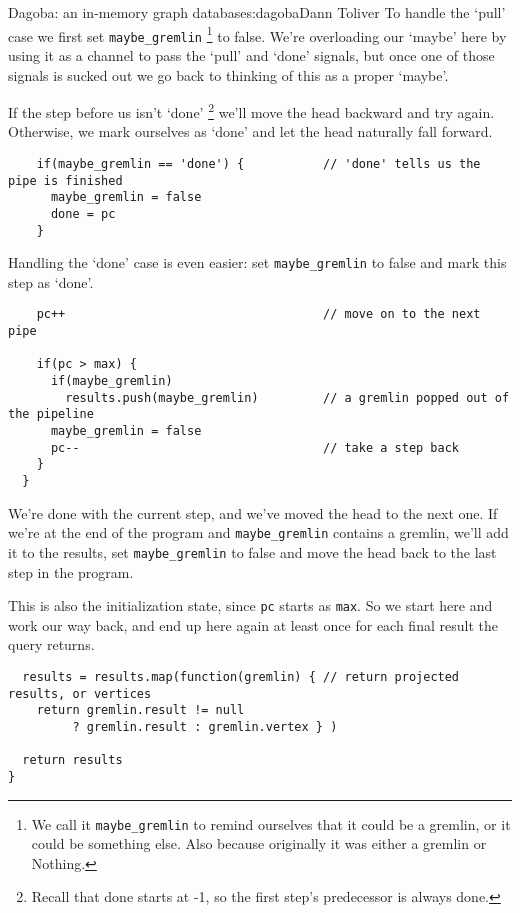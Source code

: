 \begin{aosachapter}{Dagoba: an in-memory graph database}{s:dagoba}{Dann Toliver}
To handle the `pull' case we first set \texttt{maybe\_gremlin}
\footnote{We call it \texttt{maybe\_gremlin} to remind ourselves that it
  could be a gremlin, or it could be something else. Also because
  originally it was either a gremlin or Nothing.} to false. We're
overloading our `maybe' here by using it as a channel to pass the `pull'
and `done' signals, but once one of those signals is sucked out we go
back to thinking of this as a proper `maybe'.

If the step before us isn't `done' \footnote{Recall that done starts at
  -1, so the first step's predecessor is always done.} we'll move the
head backward and try again. Otherwise, we mark ourselves as `done' and
let the head naturally fall forward.

\begin{verbatim}
    if(maybe_gremlin == 'done') {           // 'done' tells us the pipe is finished
      maybe_gremlin = false
      done = pc
    }
\end{verbatim}

Handling the `done' case is even easier: set \texttt{maybe\_gremlin} to
false and mark this step as `done'.

\begin{verbatim}
    pc++                                    // move on to the next pipe

    if(pc > max) {
      if(maybe_gremlin)
        results.push(maybe_gremlin)         // a gremlin popped out of the pipeline
      maybe_gremlin = false
      pc--                                  // take a step back
    }
  }
\end{verbatim}

We're done with the current step, and we've moved the head to the next
one. If we're at the end of the program and \texttt{maybe\_gremlin}
contains a gremlin, we'll add it to the results, set
\texttt{maybe\_gremlin} to false and move the head back to the last step
in the program.

This is also the initialization state, since \texttt{pc} starts as
\texttt{max}. So we start here and work our way back, and end up here
again at least once for each final result the query returns.

\begin{verbatim}
  results = results.map(function(gremlin) { // return projected results, or vertices
    return gremlin.result != null
         ? gremlin.result : gremlin.vertex } )

  return results
}
\end{verbatim}


\end{aosachapter}
